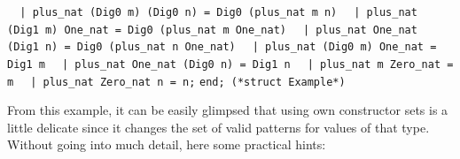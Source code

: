 \begin{isabellebody}
\begin{isamarkuptext}
\verb|  |\verb,|,\verb| plus_nat (Dig0 m) (Dig0 n) = Dig0 (plus_nat m n)|\newline%
\verb|  |\verb,|,\verb| plus_nat (Dig1 m) One_nat = Dig0 (plus_nat m One_nat)|\newline%
\verb|  |\verb,|,\verb| plus_nat One_nat (Dig1 n) = Dig0 (plus_nat n One_nat)|\newline%
\verb|  |\verb,|,\verb| plus_nat (Dig0 m) One_nat = Dig1 m|\newline%
\verb|  |\verb,|,\verb| plus_nat One_nat (Dig0 n) = Dig1 n|\newline%
\verb|  |\verb,|,\verb| plus_nat m Zero_nat = m|\newline%
\verb|  |\verb,|,\verb| plus_nat Zero_nat n = n;|\newline%
\newline%
\verb|end; (*struct Example*)|%
\end{isamarkuptext}%
\isamarkuptrue%
%
\endisatagquote
{\isafoldquote}%
%
\isadelimquote
%
\endisadelimquote
%
\begin{isamarkuptext}%
\noindent From this example, it can be easily glimpsed that using own constructor sets
  is a little delicate since it changes the set of valid patterns for values
  of that type.  Without going into much detail, here some practical hints:


\end{isamarkuptext}
\end{isabellebody}
